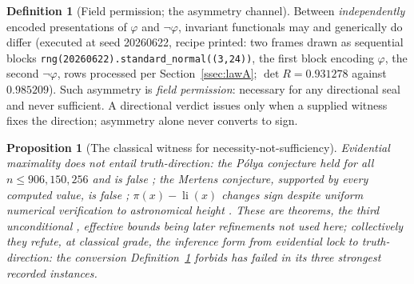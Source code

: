 \documentclass[twocolumn,10pt]{article}
\theoremstyle{plain}
\newtheorem{proposition}[theorem]{Proposition}
\theoremstyle{definition}
\newtheorem{definition}[theorem]{Definition}
\begin{document}
\begin{definition}[Field permission; the asymmetry channel]\label{def:fieldperm}
Between \emph{independently} encoded presentations of $\varphi$ and $\neg\varphi$, invariant functionals may and generically do differ (executed at seed 20260622, recipe printed: two frames drawn as sequential blocks \texttt{rng(20260622).standard\_normal((3,24))}, the first block encoding $\varphi$, the second $\neg\varphi$, rows processed per Section~\ref{ssec:lawA}; $\det R=0.931278$ against $0.985209$). Such asymmetry is \emph{field permission}: necessary for any directional seal and never sufficient. A directional verdict issues only when a supplied witness fixes the direction; asymmetry alone never converts to sign.
\end{definition}

\begin{proposition}[The classical witness for necessity-not-sufficiency]\label{prop:mountains}
Evidential maximality does not entail truth-direction: the P\'olya conjecture held for all $n\le 906{,}150{,}256$ and is false \cite{Haselgrove1958,Tanaka1980}; the Mertens conjecture, supported by every computed value, is false \cite{OdlyzkoteRiele1985}; $\pi(x)-\operatorname{li}(x)$ changes sign despite uniform numerical verification to astronomical height \cite{Littlewood1914}. These are theorems, the third unconditional \cite{Littlewood1914}, effective bounds being later refinements not used here; collectively they refute, at classical grade, the inference form from evidential lock to truth-direction: the conversion Definition~\ref{def:fieldperm} forbids has failed in its three strongest recorded instances.
\end{proposition}
\end{document}

